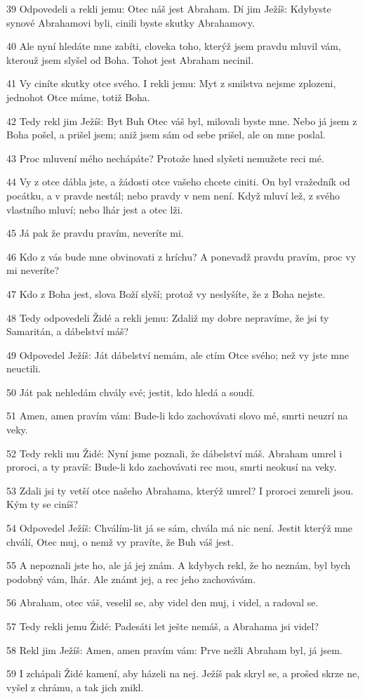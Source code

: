\par 39 Odpovedeli a rekli jemu: Otec náš jest Abraham. Dí jim Ježíš: Kdybyste synové Abrahamovi byli, cinili byste skutky Abrahamovy.
\par 40 Ale nyní hledáte mne zabíti, cloveka toho, kterýž jsem pravdu mluvil vám, kterouž jsem slyšel od Boha. Tohot jest Abraham necinil.
\par 41 Vy ciníte skutky otce svého. I rekli jemu: Myt z smilstva nejsme zplozeni, jednohot Otce máme, totiž Boha.
\par 42 Tedy rekl jim Ježíš: Byt Buh Otec váš byl, milovali byste mne. Nebo já jsem z Boha pošel, a prišel jsem; aniž jsem sám od sebe prišel, ale on mne poslal.
\par 43 Proc mluvení mého nechápáte? Protože hned slyšeti nemužete reci mé.
\par 44 Vy z otce dábla jste, a žádosti otce vašeho chcete ciniti. On byl vražedník od pocátku, a v pravde nestál; nebo pravdy v nem není. Když mluví lež, z svého vlastního mluví; nebo lhár jest a otec lži.
\par 45 Já pak že pravdu pravím, neveríte mi.
\par 46 Kdo z vás bude mne obvinovati z hríchu? A ponevadž pravdu pravím, proc vy mi neveríte?
\par 47 Kdo z Boha jest, slova Boží slyší; protož vy neslyšíte, že z Boha nejste.
\par 48 Tedy odpovedeli Židé a rekli jemu: Zdaliž my dobre nepravíme, že jsi ty Samaritán, a dábelství máš?
\par 49 Odpovedel Ježíš: Ját dábelství nemám, ale ctím Otce svého; než vy jste mne neuctili.
\par 50 Ját pak nehledám chvály své; jestit, kdo hledá a soudí.
\par 51 Amen, amen pravím vám: Bude-li kdo zachovávati slovo mé, smrti neuzrí na veky.
\par 52 Tedy rekli mu Židé: Nyní jsme poznali, že dábelství máš. Abraham umrel i proroci, a ty pravíš: Bude-li kdo zachovávati rec mou, smrti neokusí na veky.
\par 53 Zdali jsi ty vetší otce našeho Abrahama, kterýž umrel? I proroci zemreli jsou. Kým ty se ciníš?
\par 54 Odpovedel Ježíš: Chválím-lit já se sám, chvála má nic není. Jestit kterýž mne chválí, Otec muj, o nemž vy pravíte, že Buh váš jest.
\par 55 A nepoznali jste ho, ale já jej znám. A kdybych rekl, že ho neznám, byl bych podobný vám, lhár. Ale známt jej, a rec jeho zachovávám.
\par 56 Abraham, otec váš, veselil se, aby videl den muj, i videl, a radoval se.
\par 57 Tedy rekli jemu Židé: Padesáti let ješte nemáš, a Abrahama jsi videl?
\par 58 Rekl jim Ježíš: Amen, amen pravím vám: Prve nežli Abraham byl, já jsem.
\par 59 I zchápali Židé kamení, aby házeli na nej. Ježíš pak skryl se, a prošed skrze ne, vyšel z chrámu, a tak jich znikl.

